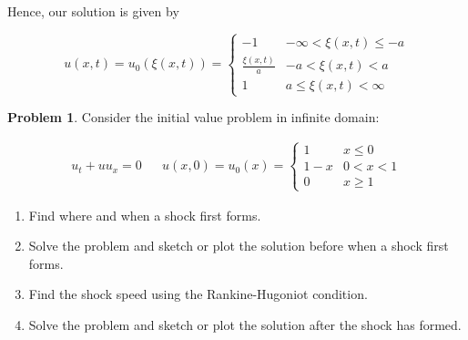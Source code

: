 \documentclass[12pt,a4paper]{article}
\theoremstyle{definition}
\newtheorem{problem}{Problem}
\theoremstyle{remark}
\begin{document}
Hence, our solution is given by 

$$u(x,t) = u_0(\xi(x,t)) = \begin{cases}
  -1 & -\infty < \xi(x,t) \le -a \\
  \frac{\xi(x,t)}{a} & -a < \xi(x,t) < a \\
  1 & a \le \xi(x,t) < \infty
\end{cases}$$

\begin{problem}
Consider the initial value problem in infinite domain: 

  \begin{align*}
    u_t + u u_x = 0 && u(x,0)=u_0(x)=\begin{cases}
        1 & x \le 0 \\
        1-x & 0 < x < 1 \\
        0 & x \ge 1
    \end{cases}
  \end{align*}
  
    \begin{enumerate}[label=(\alph*)]
      \item Find where and when a shock first forms.
      \item Solve the problem and sketch or plot the solution before when a shock first forms.
      \item Find the shock speed using the Rankine-Hugoniot condition.
      \item Solve the problem and sketch or plot the solution after the shock has formed.
    \end{enumerate}
  \end{problem}
\end{document}
